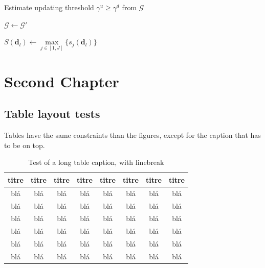 \documentclass[letterpaper%
, twoside%
, 12pt%
,these%
, english%
,creativecommons,hyperref, withAlgo2e %
]{thETS}
\begin{document}
\begin{algorithm}[!h]

\caption{Algorithm example}

\BlankLine
\BlankLine

Estimate updating threshold $\gamma^u \geq \gamma^d$ from $\mathcal G$\;

$\mathcal G \leftarrow \mathcal G'$

	
	$S(\textbf{d}_l) \leftarrow \max\limits_{j \in [1,J]}\{s_j(\textbf{d}_l)\}$\;
	
\end{algorithm}

\chapter{Second Chapter}

\section{Table layout tests}

Tables have the same constraints than the figures, except for the caption that has to be on top.


\begin{table}
\centering
		\parbox{0.65\textwidth}{\caption{Test of a long table caption, with linebreak}} %
		
		\begin{tabular}{|c|c|c|c|c|c|c|c|}
		\hline
			{\bf titre} & {\bf titre} & {\bf titre} & {\bf titre} & {\bf titre} & {\bf titre} & {\bf titre} & {\bf titre} \\
	  \hline
			blá & blá & blá & blá & blá & blá & blá & blá \\
	  \hline
			blá & blá & blá & blá & blá & blá & blá & blá \\
	  \hline
			blá & blá & blá & blá & blá & blá & blá & blá \\
	  \hline
			blá & blá & blá & blá & blá & blá & blá & blá \\
	  \hline
			blá & blá & blá & blá & blá & blá & blá & blá \\
	  \hline
			blá & blá & blá & blá & blá & blá & blá & blá \\
	  \hline
		\end{tabular}
\end{table}
\end{document}
